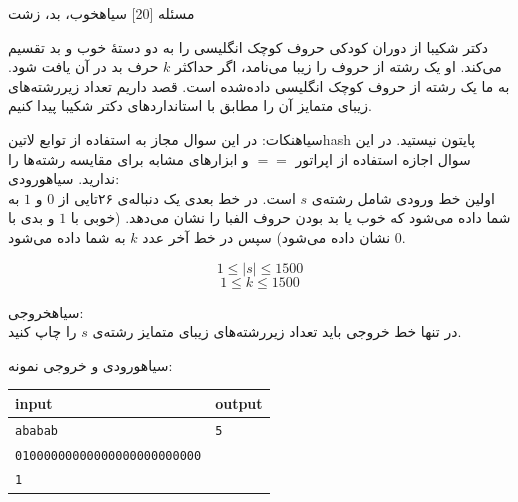 ‌مسئله [20]
‌سیاه{خوب، بد، زشت}

دکتر شکیبا از دوران کودکی حروف کوچک انگلیسی را به دو دستۀ خوب و بد تقسیم می‌کند. او یک رشته از حروف را زیبا می‌نامد، اگر حداکثر $k$ حرف بد در آن یافت شود.
به ما یک رشته از حروف کوچک انگلیسی داده‌شده است. قصد داریم تعداد زیررشته‌های زیبای متمایز آن را مطابق با استانداردهای دکتر شکیبا پیدا کنیم.

‌سیاه{نکات:}
در این سوال مجاز به استفاده از توابع ‌لاتین{hash} پایتون نیستید.
در این سوال اجازه استفاده از اپراتور $==$ و ابزارهای مشابه برای مقایسه رشته‌ها را ندارید.
‌سیاه{ورودی:}\\
اولین خط ورودی شامل رشته‌ی $s$ است. 
در خط بعدی یک دنباله‌ی ۲۶تایی از $0$ و $1$ به شما داده می‌شود که خوب یا بد بودن حروف الفبا را نشان می‌دهد. (خوبی با $1$ و بدی با $0$ نشان داده می‌شود)
سپس در خط آخر عدد $k$ به شما داده می‌شود. 

$$1 \leq |s| \leq 1500$$
$$1 \leq k \leq 1500$$

‌سیاه{خروجی:}\\
در تنها خط خروجی باید تعداد زیررشته‌های زیبای متمایز رشته‌ی $s$ را چاپ کنید.

‌سیاه{ورودی و خروجی نمونه:}\\
\begin{latin}
	\begin{tabularx}{\textwidth}{|X | X|}
		\hline
		\textbf{input} &
		\textbf{output}\\
		\hline
		\texttt{ababab}
		&
		\texttt{5}\\
		\texttt{01000000000000000000000000}&\\
		\texttt{1}&\\
		\hline
		
	\end{tabularx}
\end{latin}



